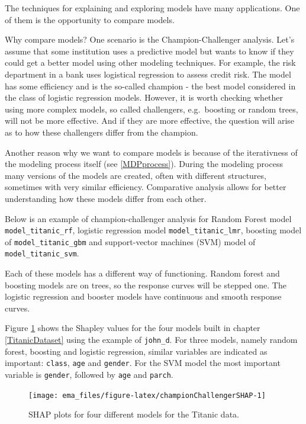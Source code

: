 \documentclass[]{krantz}
\begin{document}
The techniques for explaining and exploring models have many applications. One of them is the opportunity to compare models.

Why compare models?
One scenario is the Champion-Challenger analysis. Let's assume that some institution uses a predictive model but wants to know if they could get a better model using other modeling techniques. For example, the risk department in a bank uses logistical regression to assess credit risk. The model has some efficiency and is the so-called champion - the best model considered in the class of logistic regression models.
However, it is worth checking whether using more complex models, so called challengers, e.g.~boosting or random trees, will not be more effective. And if they are more effective, the question will arise as to how these challengers differ from the champion.

Another reason why we want to compare models is because of the iterativness of the modeling process itself (see \ref{MDPprocess}). During the modeling process many versions of the models are created, often with different structures, sometimes with very similar efficiency. Comparative analysis allows for better understanding how these models differ from each other.

Below is an example of champion-challenger analysis for Random Forest model \texttt{model\_titanic\_rf}, logistic regression model \texttt{model\_titanic\_lmr}, boosting model of \texttt{model\_titanic\_gbm} and support-vector machines (SVM) model of \texttt{model\_titanic\_svm}.

Each of these models has a different way of functioning. Random forest and boosting models are on trees, so the response curves will be stepped one. The logistic regression and booster models have continuous and smooth response curves.

Figure \ref{fig:championChallengerSHAP} shows the Shapley values for the four models built in chapter \ref{TitanicDataset} using the example of \texttt{john\_d}. For three models, namely random forest, boosting and logistic regression, similar variables are indicated as important: \texttt{class}, \texttt{age} and \texttt{gender}. For the SVM model the most important variable is \texttt{gender}, followed by \texttt{age} and \texttt{parch}.

\begin{figure}

{\centering \texttt{[image: ema\_files/figure-latex/championChallengerSHAP-1]} 

}

\caption{SHAP plots for four different models for the Titanic data.}\label{fig:championChallengerSHAP}
\end{figure}
\end{document}
